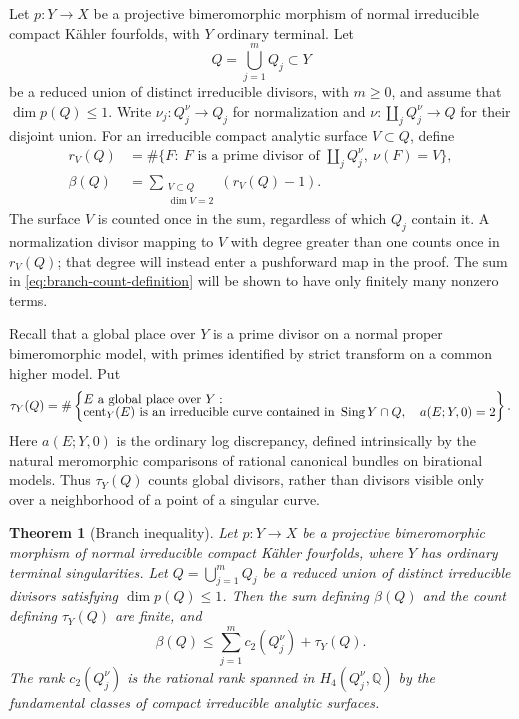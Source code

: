 \documentclass[11pt]{amsart}
\newtheorem{theorem}{Theorem}[section]
\theoremstyle{definition}
\theoremstyle{remark}
\numberwithin{equation}{section}
\newcommand{\Q}{\mathbb{Q}}
\DeclareMathOperator{\Sing}{Sing}
\DeclareMathOperator{\cent}{cent}
\begin{document}
Let $p\colon Y\to X$ be a projective bimeromorphic morphism of normal
irreducible compact K\"ahler fourfolds, with $Y$ ordinary terminal.  Let
\[
 Q=\bigcup_{j=1}^{m}Q_j\subset Y
\]
be a reduced union of distinct irreducible divisors, with $m\geq0$, and assume that
$\dim p(Q)\leq1$.  Write $\nu_j\colon Q_j^\nu\to Q_j$ for normalization
and $\nu\colon\coprod_jQ_j^\nu\to Q$ for their disjoint union.  For an
irreducible compact analytic surface $V\subset Q$, define
\begin{equation}\label{eq:branch-count-definition}
 \begin{aligned}
 r_V(Q)&=\#\{F:\ F\text{ is a prime divisor of }\coprod_jQ_j^\nu,
                         \ \nu(F)=V\},\\
 \beta(Q)&=\sum_{\substack{V\subset Q\\ \dim V=2}}(r_V(Q)-1).
 \end{aligned}
\end{equation}
The surface $V$ is counted once in the sum, regardless of which $Q_j$
contain it.  A normalization divisor mapping to $V$ with degree greater
than one counts once in $r_V(Q)$; that degree will instead enter a
pushforward map in the proof.  The sum in
\eqref{eq:branch-count-definition} will be shown to have only finitely
many nonzero terms.

Recall that a global place over $Y$ is a prime divisor on a normal proper
bimeromorphic model, with primes identified by strict transform on a
common higher model.  Put
\begin{equation}\label{eq:branch-place-count}
 \tau_Y(Q)=\#\left\{
 \begin{array}{@{}l@{}}
 E\text{ a global place over }Y:\\[-2pt]
 \cent_Y(E)\text{ is an irreducible curve contained in }\Sing Y\cap Q,
 \quad a(E;Y,0)=2
 \end{array}\right\}.
\end{equation}
Here $a(E;Y,0)$ is the ordinary log discrepancy, defined intrinsically
by the natural meromorphic comparisons of rational canonical bundles
on birational models.  Thus
$\tau_Y(Q)$ counts global divisors, rather than divisors visible only
over a neighborhood of a point of a singular curve.

\begin{theorem}[Branch inequality]\label{thm:branch}
Let $p\colon Y\to X$ be a projective bimeromorphic morphism of normal
irreducible compact K\"ahler fourfolds, where $Y$ has ordinary terminal
singularities.  Let $Q=\bigcup_{j=1}^{m}Q_j$ be a reduced union of
distinct irreducible divisors satisfying $\dim p(Q)\leq1$.  Then the
sum defining $\beta(Q)$ and the count defining $\tau_Y(Q)$ are finite,
and
\begin{equation}\label{eq:branch-inequality}
 \beta(Q)\leq\sum_{j=1}^{m}c_2(Q_j^\nu)+\tau_Y(Q).
\end{equation}
The rank $c_2(Q_j^\nu)$ is the rational rank spanned in
$H_4(Q_j^\nu,\Q)$ by the fundamental classes of compact irreducible
analytic surfaces.
\end{theorem}
\end{document}
